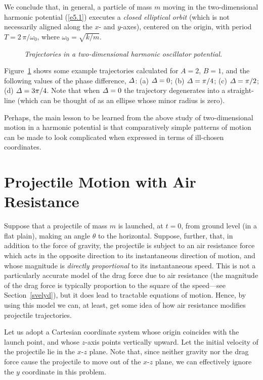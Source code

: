 We conclude that, in general, a particle of mass $m$ moving in the two-dimensional harmonic potential (\ref{e5.1}) executes a {\em closed elliptical
orbit}\/ (which is not necessarily aligned along the $x$- and $y$-axes), centered on the origin, with
period $T = 2\,\pi/\omega_0$, where $\omega_0=\sqrt{k/m}$. 

\begin{figure}[h]
\epsfysize=3.25in
\centerline{}
\caption{\em Trajectories in a two-dimensional harmonic oscillator potential.}\label{f24}
\end{figure}

Figure~\ref{f24} shows  some example trajectories calculated for $A=2$, $B=1$, and
the following values of the phase difference, ${\mit\Delta}$: (a) ${\mit\Delta}=0$; (b) ${\mit\Delta}=\pi/4$; (c) ${\mit\Delta}=\pi/2$;
(d) ${\mit\Delta}= 3\pi/4$. Note that when ${\mit\Delta}=0$ the
trajectory degenerates into a straight-line (which can be thought of as an
ellipse whose minor radius is zero).

Perhaps, the main lesson to be learned from the above study of two-dimensional
motion in a harmonic potential is that comparatively simple patterns of
motion can be made to look complicated when expressed 
in terms of ill-chosen coordinates.

\section{Projectile Motion with Air Resistance}
Suppose that a
projectile of mass $m$ is launched, at $t=0$, from ground level (in a flat plain), making an angle $\theta$ to the horizontal. Suppose, further, that, in addition
to the force of gravity, the projectile is subject to an air resistance
force which acts in the opposite direction to  its instantaneous
direction of motion, and whose magnitude is {\em directly proportional}\/ to its  instantaneous speed. This is not a particularly accurate model
of the drag force due to air resistance (the magnitude of the drag force is typically proportion
to the square of the speed---see Section~\ref{svelyd}), but it does lead to
tractable equations of motion. Hence, by using this model we can, at least,
get some idea of how air resistance modifies projectile trajectories.

Let us adopt a Cartesian coordinate system whose origin coincides with the launch point, and whose $z$-axis
points vertically upward. Let the initial velocity of the projectile
lie in the $x$-$z$ plane. Note that, since neither gravity nor the drag force 
cause the projectile to  move out of the $x$-$z$ plane,
we can effectively ignore the $y$ coordinate in this problem.


